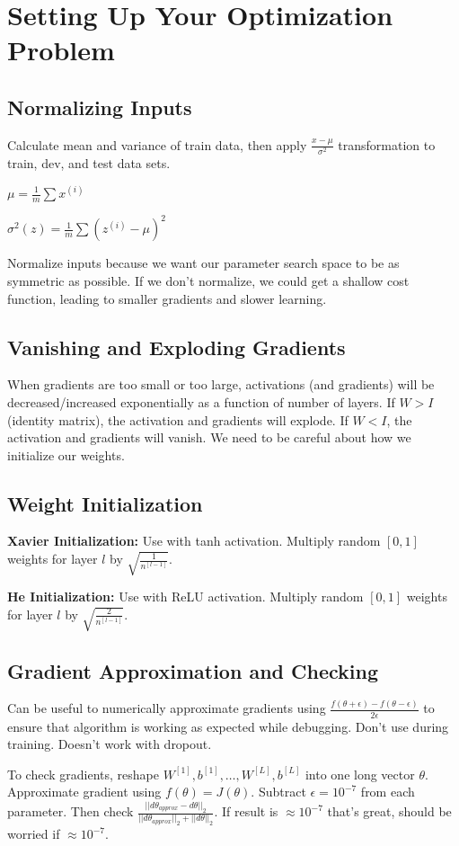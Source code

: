 \section{Setting Up Your Optimization Problem}

\subsection{Normalizing Inputs}

Calculate mean and variance of train data, then apply $\frac{x - \mu}{\sigma ^2}$ transformation  to train, dev, and test data sets.

$\mu = \frac{1}{m} \sum x^{(i)}$

$\sigma ^2 (z) = \frac{1}{m} \sum (z^{(i)} - \mu)^2$

Normalize inputs because we want our parameter search space to be as symmetric as possible. If we don't normalize, we could get a shallow cost function, leading to smaller gradients and slower learning.

\subsection{Vanishing and Exploding Gradients}

When gradients are too small or too large, activations (and gradients) will be decreased/increased exponentially as a function of number of layers. If $W > I$ (identity matrix), the activation and gradients will explode. If $W < I$, the activation and gradients will vanish. We need to be careful about how we initialize our weights.

\subsection{Weight Initialization}

\textbf{Xavier Initialization:} Use with tanh activation. Multiply random $[0,1]$ weights for layer $l$ by $\sqrt{\frac{1}{n^{[l-1]}}}$.

\textbf{He Initialization:} Use with ReLU activation. Multiply random $[0,1]$ weights for layer $l$ by $\sqrt{\frac{2}{n^{[l-1]}}}$.

\subsection{Gradient Approximation and Checking}

Can be useful to numerically approximate gradients using $\frac{f(\theta + \epsilon) - f(\theta - \epsilon)}{2 \epsilon}$ to ensure that algorithm is working as expected while debugging. Don't use during training. Doesn't work with dropout.

To check gradients, reshape $W^{[1]}, b^{[1]}, \dots , W^{[L]}, b^{[L]}$ into one long vector $\theta$. Approximate gradient using $f(\theta) = J(\theta)$. Subtract $\epsilon = 10^{-7}$ from each parameter. Then check $\frac{||d \theta _{approx} - d \theta||_2}{||d \theta _{approx}||_2 + ||d \theta||_2}$. If result is $\approx 10^{-7}$ that's great, should be worried if $\approx 10^{-7}$.
